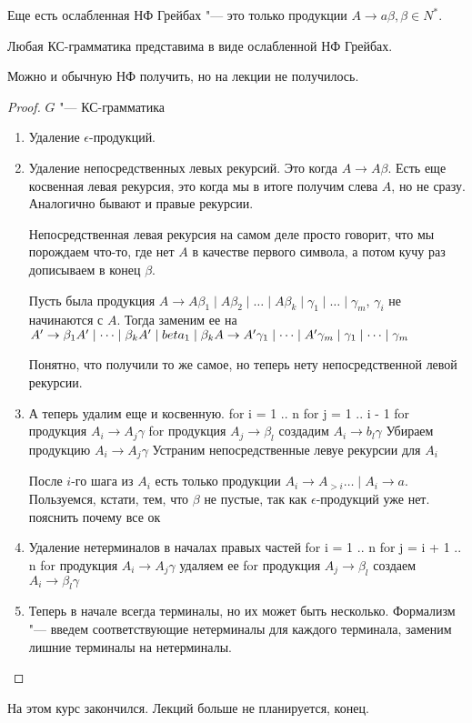 Еще есть ослабленная НФ Грейбах "--- это только продукции $A \to a \beta, \beta \in N^*$.

\begin{theorem}
Любая КС-грамматика представима в виде ослабленной НФ Грейбах.
\end{theorem} 
\begin{Rem}
Можно и обычную НФ получить, но на лекции не получилось.
\end{Rem}
\begin{proof}
$G$ "--- КС-грамматика

\begin{enumerate}
\item
Удаление $\epsilon$-продукций.

\item
Удаление непосредственных левых рекурсий. Это когда $A \to A \beta$. 
Есть еще косвенная левая рекурсия, это когда мы в итоге получим слева $A$, но не сразу.
Аналогично бывают и правые рекурсии.

Непосредственная левая рекурсия на самом деле просто говорит, что мы порождаем что-то, где нет $A$ в качестве первого символа, а потом кучу раз дописываем в конец $\beta$.

Пусть была продукция $A \to A \beta_1 \mid A\beta_2 \mid \dots \mid A \beta_k \mid \gamma_1 \mid \dots \mid \gamma_m$, $\gamma_i$ не начинаются с $A$.
Тогда заменим ее на $\\
A' \to \beta_1 A' \mid \dots \mid \beta_k A' \mid beta_1 \mid \beta_k \\
A \to A' \gamma_1 \mid \dots \mid A' \gamma_m \mid \gamma_1 \mid \dots \mid \gamma_m$ 

Понятно, что получили то же самое, но теперь нету непосредственной левой рекурсии.

\item
А теперь удалим еще и косвенную.
for i = 1 .. n
    for j = 1 .. i - 1
        for продукция $A_i \to A_j \gamma$
            for продукция $A_j \to \beta_l$
                создадим $A_i \to b_l \gamma$
            Убираем продукцию $A_i \to A_j \gamma$
    Устраним непосредственные левуе рекурсии для $A_i$

После $i$-го шага из $A_i$ есть только продукции $A_i \to A_{>i} \dots \mid A_i \to a$.
Пользуемся, кстати, тем, что $\beta$ не пустые, так как $\epsilon$-продукций уже нет.
\TODO пояснить почему все ок

\item
Удаление нетерминалов в началах правых частей
for i = 1 .. n
    for j = i + 1 .. n
        for продукция $A_i \to A_j \gamma$
            удаляем ее
            for продукция $A_j \to \beta_l$
                создаем $A_i \to \beta_l \gamma$

\item
Теперь в начале всегда терминалы, но их может быть несколько.
Формализм "--- введем соответствующие нетерминалы для каждого терминала, заменим лишние терминалы на нетерминалы.     

\end{enumerate}
\end{proof}

На этом курс закончился. Лекций больше не планируется, конец.

